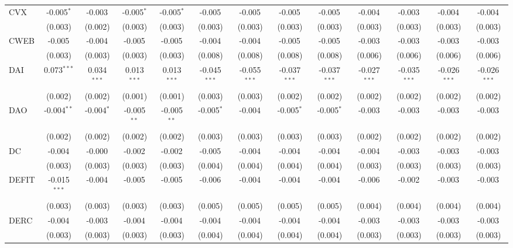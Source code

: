 \begin{table}[!htbp]
\begin{tabular}{@{\extracolsep{5pt}}lcccccccccccc}
 CVX & -0.005$^{*}$ & -0.003$^{}$ & -0.005$^{*}$ & -0.005$^{*}$ & -0.005$^{}$ & -0.005$^{}$ & -0.005$^{}$ & -0.005$^{}$ & -0.004$^{}$ & -0.003$^{}$ & -0.004$^{}$ & -0.004$^{}$ \\
  & (0.003) & (0.002) & (0.003) & (0.003) & (0.003) & (0.003) & (0.003) & (0.003) & (0.003) & (0.003) & (0.003) & (0.003) \\
 CWEB & -0.005$^{}$ & -0.004$^{}$ & -0.005$^{}$ & -0.005$^{}$ & -0.004$^{}$ & -0.004$^{}$ & -0.005$^{}$ & -0.005$^{}$ & -0.003$^{}$ & -0.003$^{}$ & -0.003$^{}$ & -0.003$^{}$ \\
  & (0.003) & (0.003) & (0.003) & (0.003) & (0.008) & (0.008) & (0.008) & (0.008) & (0.006) & (0.006) & (0.006) & (0.006) \\
 DAI & 0.073$^{***}$ & 0.034$^{***}$ & 0.013$^{***}$ & 0.013$^{***}$ & -0.045$^{***}$ & -0.055$^{***}$ & -0.037$^{***}$ & -0.037$^{***}$ & -0.027$^{***}$ & -0.035$^{***}$ & -0.026$^{***}$ & -0.026$^{***}$ \\
  & (0.002) & (0.002) & (0.001) & (0.001) & (0.003) & (0.003) & (0.002) & (0.002) & (0.002) & (0.002) & (0.002) & (0.002) \\
 DAO & -0.004$^{**}$ & -0.004$^{*}$ & -0.005$^{**}$ & -0.005$^{**}$ & -0.005$^{*}$ & -0.004$^{}$ & -0.005$^{*}$ & -0.005$^{*}$ & -0.003$^{}$ & -0.003$^{}$ & -0.003$^{}$ & -0.003$^{}$ \\
  & (0.002) & (0.002) & (0.002) & (0.002) & (0.003) & (0.003) & (0.003) & (0.003) & (0.002) & (0.002) & (0.002) & (0.002) \\
 DC & -0.004$^{}$ & -0.000$^{}$ & -0.002$^{}$ & -0.002$^{}$ & -0.005$^{}$ & -0.004$^{}$ & -0.004$^{}$ & -0.004$^{}$ & -0.004$^{}$ & -0.003$^{}$ & -0.003$^{}$ & -0.003$^{}$ \\
  & (0.003) & (0.003) & (0.003) & (0.003) & (0.004) & (0.004) & (0.004) & (0.004) & (0.003) & (0.003) & (0.003) & (0.003) \\
 DEFIT & -0.015$^{***}$ & -0.004$^{}$ & -0.005$^{}$ & -0.005$^{}$ & -0.006$^{}$ & -0.004$^{}$ & -0.004$^{}$ & -0.004$^{}$ & -0.006$^{}$ & -0.002$^{}$ & -0.003$^{}$ & -0.003$^{}$ \\
  & (0.003) & (0.003) & (0.003) & (0.003) & (0.005) & (0.005) & (0.005) & (0.005) & (0.004) & (0.004) & (0.004) & (0.004) \\
 DERC & -0.004$^{}$ & -0.003$^{}$ & -0.004$^{}$ & -0.004$^{}$ & -0.004$^{}$ & -0.004$^{}$ & -0.004$^{}$ & -0.004$^{}$ & -0.003$^{}$ & -0.003$^{}$ & -0.003$^{}$ & -0.003$^{}$ \\
  & (0.003) & (0.003) & (0.003) & (0.003) & (0.004) & (0.004) & (0.004) & (0.004) & (0.003) & (0.003) & (0.003) & (0.003) \\

\end{tabular}
\end{table}
